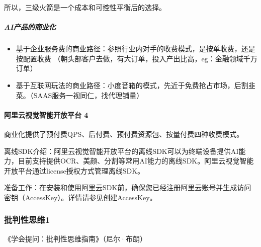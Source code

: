 \documentclass[letterpaper,11pt,english]{sphinxmanual}
\begin{document}
所以，三级火箭是一个成本和可控性平衡后的选择。


\subparagraph{AI产品的商业化}
\label{\detokenize{chapter_idea/business:ai}}\begin{itemize}
\item {} 
基于企业服务费的商业路径：参照行业内对手的收费模式，是按单收费，还是按配置收费
（朝头部客户去做，有大订单，投入产出比高，eg：金融领域千万订单）

\item {} 
基于互联网玩法的商业路径：小度音箱的模式，先近于免费抢占市场，后割韭菜。（SAAS服务一视同仁，找代理铺量）

\end{itemize}


\paragraph{阿里云视觉智能开放平台 4\sphinxfootnotemark[129]}
\label{\detokenize{chapter_idea/business:id21}}%
\begin{footnotetext}[127]\sphinxAtStartFootnote
{}
%
\end{footnotetext}\ignorespaces %
\begin{footnotetext}[128]\sphinxAtStartFootnote
{}
%
\end{footnotetext}\ignorespaces %
\begin{footnotetext}[129]\sphinxAtStartFootnote
{}
%
\end{footnotetext}\ignorespaces 
商业化提供了预付费QPS、后付费、预付费资源包、按量付费四种收费模式。

离线SDK介绍：阿里云视觉智能开放平台的离线SDK可以为终端设备提供AI能力，目前支持提供OCR、美颜、分割等常用AI能力的离线SDK。阿里云视觉智能开放平台通过license授权方式管理离线SDK。

准备工作：在安装和使用阿里云SDK前，确保您已经注册阿里云账号并生成访问密钥（AccessKey）。详情请参见创建AccessKey。


\subsubsection{批判性思维1\sphinxfootnotemark[130]}
\label{\detokenize{chapter_idea/critical:id1}}\label{\detokenize{chapter_idea/critical::doc}}%
\begin{footnotetext}[130]\sphinxAtStartFootnote
{}
%
\end{footnotetext}\ignorespaces 
《学会提问：批判性思维指南》（尼尔·布朗）
\end{document}

